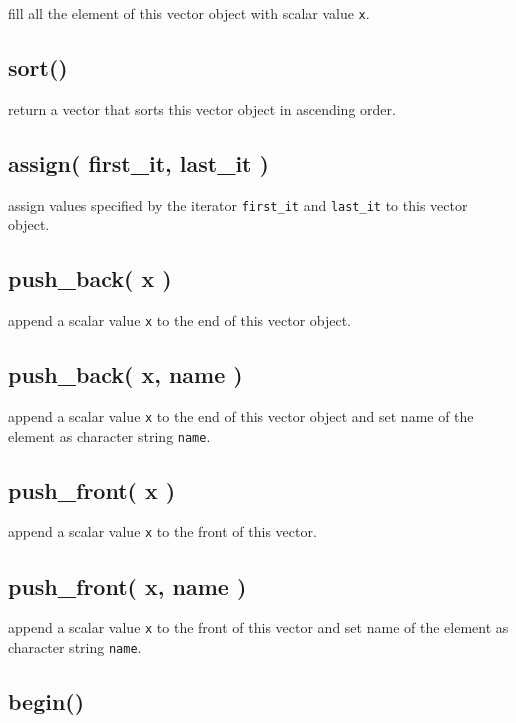 \documentclass[]{book}
\theoremstyle{definition}
\theoremstyle{definition}
\theoremstyle{remark}
\begin{document}
fill all the element of this vector object with scalar value \texttt{x}.

\subsection{sort()}\label{sort}

return a vector that sorts this vector object in ascending order.

\subsection{assign( first\_it, last\_it
)}\label{assign-first_it-last_it}

assign values specified by the iterator \texttt{first\_it} and
\texttt{last\_it} to this vector object.

\subsection{push\_back( x )}\label{push_back-x}

append a scalar value \texttt{x} to the end of this vector object.

\subsection{push\_back( x, name )}\label{push_back-x-name}

append a scalar value \texttt{x} to the end of this vector object and
set name of the element as character string \texttt{name}.

\subsection{push\_front( x )}\label{push_front-x}

append a scalar value \texttt{x} to the front of this vector.

\subsection{push\_front( x, name )}\label{push_front-x-name}

append a scalar value \texttt{x} to the front of this vector and set
name of the element as character string \texttt{name}.

\subsection{begin()}\label{begin}
\end{document}
